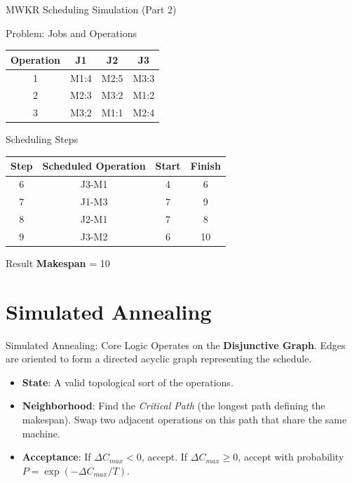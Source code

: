 \documentclass{beamer}
\begin{document}
\begin{frame}{MWKR Scheduling Simulation (Part 2)}
\begin{block}{Problem: Jobs and Operations}
\small
\begin{tabular}{c|ccc}
Operation & J1 & J2 & J3 \\
\hline
1 & M1:4 & M2:5 & M3:3 \\
2 & M2:3 & M3:2 & M1:2 \\
3 & M3:2 & M1:1 & M2:4 \\
\end{tabular}
\end{block}

\pause

\begin{block}{Scheduling Steps}
\small
\begin{tabular}{c|c|c|c}
Step & Scheduled Operation & Start & Finish \\
\hline
6 & J3-M1 & 4 & 6 \\
7 & J1-M3 & 7 & 9 \\
8 & J2-M1 & 7 & 8 \\
9 & J3-M2 & 6 & 10 \\
\end{tabular}
\end{block}
\pause
\begin{block}{Result}
\textbf{Makespan} = 10
\end{block}
\end{frame}

\section{Simulated Annealing}

\begin{frame}{Simulated Annealing: Core Logic}
    Operates on the \textbf{Disjunctive Graph}. Edges are oriented to form a directed acyclic graph representing the schedule.
    
    \begin{itemize}[<+->]
        \item \textbf{State}: A valid topological sort of the operations.
        \item \textbf{Neighborhood}: Find the \textit{Critical Path} (the longest path defining the makespan). Swap two adjacent operations on this path that share the same machine.
        \item \textbf{Acceptance}: If $\Delta C_{max} < 0$, accept. If $\Delta C_{max} \ge 0$, accept with probability $P = \exp(-\Delta C_{max} / T)$.
    \end{itemize}
\end{frame}
\end{document}
